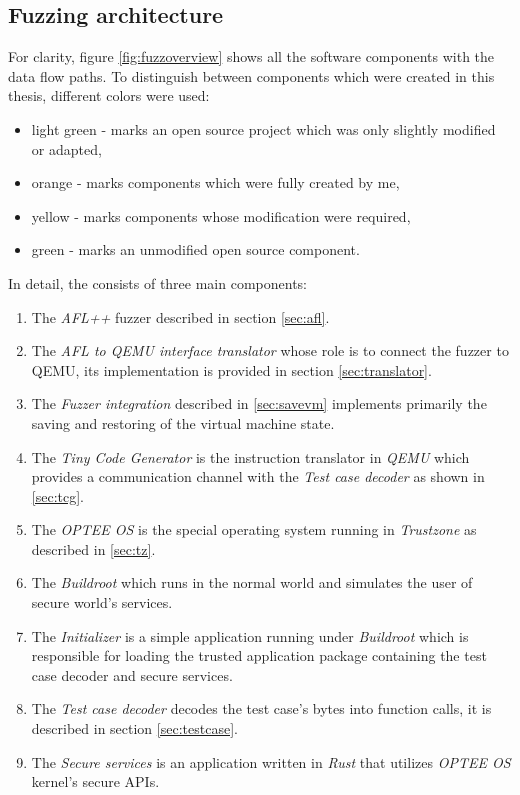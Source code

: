 \subsection{Fuzzing architecture}
For clarity, figure \ref{fig:fuzzoverview} shows all the software components with the data flow paths. To distinguish between components which were created in this thesis, different colors were used:
\begin{itemize}
    \item \colorbox{green!30}{light green} - marks an open source project which was only slightly modified or adapted,
    \item \colorbox{orange!30}{orange} - marks components which were fully created by me,
    \item \colorbox{yellow!30}{yellow} - marks components whose modification were required,
    \item \colorbox{green!60}{green} - marks an unmodified open source component.
\end{itemize}
In detail, the consists of three main components:
\begin{enumerate}
    \item The \textit{AFL++} fuzzer described in section \ref{sec:afl}.
    \item The \textit{AFL to QEMU interface translator} whose role is to connect the fuzzer to QEMU, its implementation is provided in section \ref{sec:translator}.
    \item The \textit{Fuzzer integration} described in \ref{sec:savevm} implements primarily the saving and restoring of the virtual machine state.
    \item The \textit{Tiny Code Generator} is the instruction translator in \textit{QEMU} which provides a communication channel with the \textit{Test case decoder} as shown in \ref{sec:tcg}.
    \item The \textit{OPTEE OS} is the special operating system running in \textit{Trustzone} as described in \ref{sec:tz}.
    \item The \textit{Buildroot} which runs in the normal world and simulates the user of secure world's services.
    \item The \textit{Initializer} is a simple application running under \textit{Buildroot} which is responsible for loading the trusted application package containing the test case decoder and secure services.
    \item The \textit{Test case decoder} decodes the test case's bytes into function calls, it is described in section \ref{sec:testcase}.
    \item The \textit{Secure services} is an application written in \textit{Rust} that utilizes \textit{OPTEE OS} kernel's secure APIs.
\end{enumerate}

